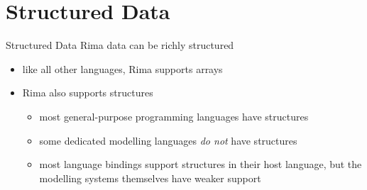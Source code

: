 \documentclass[smaller,handout]{beamer}
\begin{document}
\begin{comment}
\begin{frame}{Section Summary}
  Symbolic expressions and models offer
  \begin{itemize}
    \item clean separation of model equations and data
    \item the ability to encapsulate a model as an object or module
  \end{itemize}
\end{frame}
\end{comment}


\section{Structured Data}

\begin{frame}{Structured Data}
  Rima data can be richly structured
  \begin{itemize}
    \item like all other languages, Rima supports arrays
    \item Rima also supports structures
    \begin{itemize}
      \item most general-purpose programming languages have structures
      \item some dedicated modelling languages \emph{do not} have structures
      \item most language bindings support structures in their host language, but the modelling systems themselves have weaker support
    \end{itemize}
 \end{itemize}
\end{frame}


\end{document}
